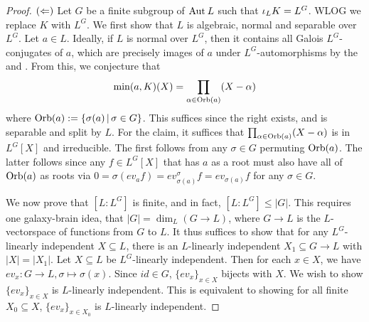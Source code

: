 \documentclass[main.tex]{subfiles}
\begin{document}
\begin{proof}
  $(\Leftarrow)$ Let $G$ be a finite subgroup of $\operatorname{Aut}_{}{L}$ such that 
  $\iota_L K = L^G$. 
  WLOG we replace $K$ with $L^G$. 
  We first show that $L$ is algebraic, normal and separable over $L^G$. 
  Let $a \in L$. 
  Ideally, if $L$ is normal over $L^G$, then 
  it contains all Galois $L^G$-conjugates of $a$,
  which are precisely images of $a$ under $L^G$-automorphisms by
  the 
  and .
  From this, we conjecture that
  \[ \min(a,K)(X) = \prod_{\alpha \in \operatorname{Orb}(a)} (X - \alpha) \]
  where $\operatorname{Orb}(a) := \left\{\sigma(a) \,|\, \sigma \in G\right\}$.
  This suffices since the right exists, and is separable and split by $L$.
  For the claim, it suffices that $\prod_{\alpha \in \operatorname{Orb}(a)} (X - \alpha)$
  is in $L^G[X]$ and irreducible. 
  The first follows from any $\sigma \in G$ permuting $\operatorname{Orb}(a)$.
  The latter follows since any $f \in L^G[X]$ that 
  has $a$ as a root must also have all of $\operatorname{Orb}(a)$ as roots via
  $0 = \sigma(ev_a f) = ev_{\sigma(a)}^\sigma f = ev_{\sigma(a)} f$
  for any $\sigma \in G$.


  We now prove that $[L : L^G]$ is finite, and in fact, 
  $[L : L^G] \leq |G|$. 
  This requires one galaxy-brain idea,
  that $|G| = \dim_L (G \to L)$, 
  where $G \to L$ is the $L$-vectorspace of functions from $G$ to $L$. 
  It thus suffices to show that 
  for any $L^G$-linearly independent $X \subseteq L$, 
  there is an $L$-linearly independent $X_1 \subseteq G \to L$
  with $|X| = |X_1|$. 
  Let $X \subseteq L$ be $L^G$-linearly independent.
  Then for each $x \in X$, we have $ev_x : G \to L, \sigma \mapsto \sigma(x)$.
  Since $id \in G$, $\{ev_x\}_{x \in X}$ bijects with $X$. 
  We wish to show $\{ev_x\}_{x \in X}$ is $L$-linearly independent. 
  This is equivalent to showing for all finite $X_0 \subseteq X$,
  $\{ev_x\}_{x \in X_0}$ is $L$-linearly independent. 


\end{proof}
\end{document}
